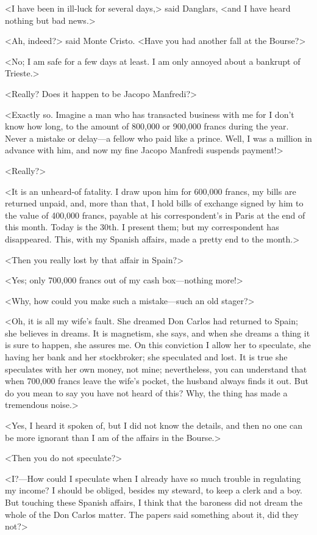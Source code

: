  <I have been in ill-luck for several days,> said Danglars, <and I have heard nothing but bad news.> 

 <Ah, indeed?> said Monte Cristo. <Have you had another fall at the Bourse?> 

 <No; I am safe for a few days at least. I am only annoyed about a bankrupt of Trieste.> 

 <Really? Does it happen to be Jacopo Manfredi?> 

 <Exactly so. Imagine a man who has transacted business with me for I don't know how long, to the amount of 800,000 or 900,000 francs during the year. Never a mistake or delay—a fellow who paid like a prince. Well, I was a million in advance with him, and now my fine Jacopo Manfredi suspends payment!> 

 <Really?> 

 <It is an unheard-of fatality. I draw upon him for 600,000 francs, my bills are returned unpaid, and, more than that, I hold bills of exchange signed by him to the value of 400,000 francs, payable at his correspondent's in Paris at the end of this month. Today is the 30th. I present them; but my correspondent has disappeared. This, with my Spanish affairs, made a pretty end to the month.> 

 <Then you really lost by that affair in Spain?> 

 <Yes; only 700,000 francs out of my cash box—nothing more!> 

 <Why, how could you make such a mistake—such an old stager?> 

 <Oh, it is all my wife's fault. She dreamed Don Carlos had returned to Spain; she believes in dreams. It is magnetism, she says, and when she dreams a thing it is sure to happen, she assures me. On this conviction I allow her to speculate, she having her bank and her stockbroker; she speculated and lost. It is true she speculates with her own money, not mine; nevertheless, you can understand that when 700,000 francs leave the wife's pocket, the husband always finds it out. But do you mean to say you have not heard of this? Why, the thing has made a tremendous noise.> 

 <Yes, I heard it spoken of, but I did not know the details, and then no one can be more ignorant than I am of the affairs in the Bourse.>

<Then you do not speculate?> 

 <I?—How could I speculate when I already have so much trouble in regulating my income? I should be obliged, besides my steward, to keep a clerk and a boy. But touching these Spanish affairs, I think that the baroness did not dream the whole of the Don Carlos matter. The papers said something about it, did they not?> 

